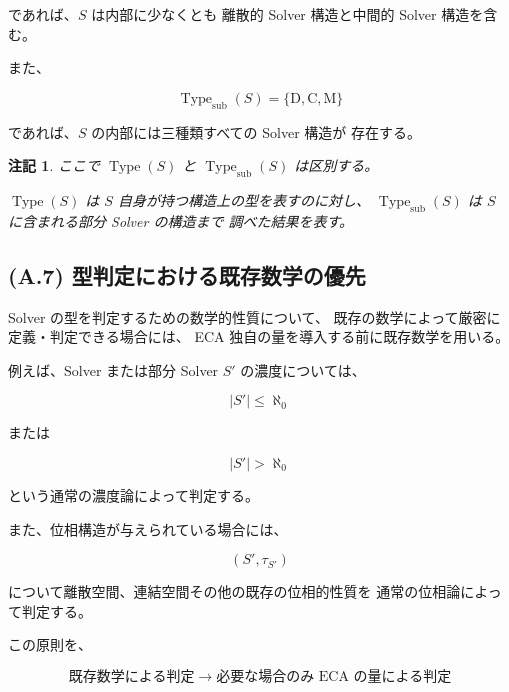 \documentclass[a4paper,11pt]{article}
\newtheorem{remark}[definition]{注記}
\newcommand{\Type}{\operatorname{Type}}
\newcommand{\DType}{\mathrm{D}}
\newcommand{\CType}{\mathrm{C}}
\newcommand{\MType}{\mathrm{M}}
\begin{document}
であれば、$S$ は内部に少なくとも
離散的 Solver 構造と中間的 Solver 構造を含む。

また、

\begin{equation}
    \Type_{\mathrm{sub}}(S)
    =
    \{\DType,\CType,\MType\}
\end{equation}

であれば、$S$ の内部には三種類すべての Solver 構造が
存在する。

\begin{remark}
ここで $\Type(S)$ と $\Type_{\mathrm{sub}}(S)$ は区別する。

$\Type(S)$ は $S$ 自身が持つ構造上の型を表すのに対し、
$\Type_{\mathrm{sub}}(S)$ は $S$ に含まれる部分 Solver の構造まで
調べた結果を表す。
\end{remark}


\subsection{(A.7) 型判定における既存数学の優先}
\label{subsec:A7}

Solver の型を判定するための数学的性質について、
既存の数学によって厳密に定義・判定できる場合には、
ECA 独自の量を導入する前に既存数学を用いる。

例えば、Solver または部分 Solver $S'$ の濃度については、

\begin{equation}
    |S'|\leq\aleph_0
\end{equation}

または

\begin{equation}
    |S'|>\aleph_0
\end{equation}

という通常の濃度論によって判定する。

また、位相構造が与えられている場合には、

\begin{equation}
    (S',\tau_{S'})
\end{equation}

について離散空間、連結空間その他の既存の位相的性質を
通常の位相論によって判定する。

この原則を、

\begin{equation}
    \boxed{
    \text{既存数学による判定}
    \;\longrightarrow\;
    \text{必要な場合のみ ECA の量による判定}
    }
    \label{eq:A-existing-math-priority}
\end{equation}
\end{document}
